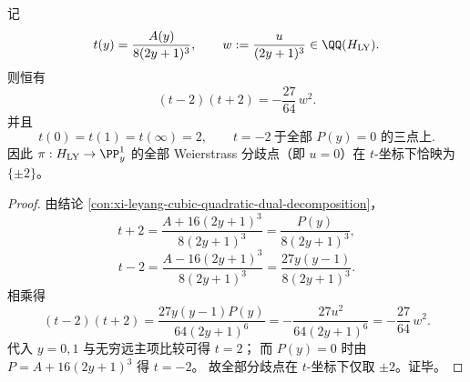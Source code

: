 \begin{conclusion}\label{con:xi-leyang-weierstrass-branch-binary-collapse-in-t}
记
\[
t(y)=\frac{A(y)}{8(2y+1)^3},\qquad
w:=\frac{u}{(2y+1)^3}\in \QQ(H_{\mathrm{LY}}).
\]
则恒有
\[
(t-2)(t+2)=-\frac{27}{64}\,w^2.
\]
并且
\[
t(0)=t(1)=t(\infty)=2,\qquad
t=-2\ \text{于全部 }P(y)=0\text{ 的三点上}.
\]
因此 \(\pi:H_{\mathrm{LY}}\to\PP^1_y\) 的全部 Weierstrass 分歧点（即 \(u=0\)）在 \(t\)-坐标下恰映为 \(\{\pm2\}\)。
\end{conclusion}
\begin{proof}
由结论 \ref{con:xi-leyang-cubic-quadratic-dual-decomposition}，
\[
t+2=\frac{A+16(2y+1)^3}{8(2y+1)^3}=\frac{P(y)}{8(2y+1)^3},
\]
\[
t-2=\frac{A-16(2y+1)^3}{8(2y+1)^3}=\frac{27y(y-1)}{8(2y+1)^3}.
\]
相乘得
\[
(t-2)(t+2)
=\frac{27y(y-1)P(y)}{64(2y+1)^6}
=-\frac{27u^2}{64(2y+1)^6}
=-\frac{27}{64}\,w^2.
\]
代入 \(y=0,1\) 与无穷远主项比较可得 \(t=2\)；
而 \(P(y)=0\) 时由 \(P=A+16(2y+1)^3\) 得 \(t=-2\)。
故全部分歧点在 \(t\)-坐标下仅取 \(\pm2\)。证毕。
\end{proof}

